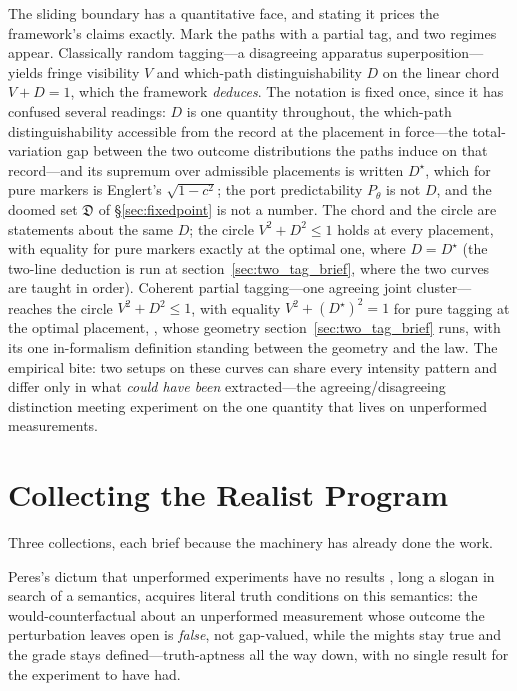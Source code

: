 \documentclass[11pt]{article}
\theoremstyle{definition}
\begin{document}
The sliding boundary has a quantitative face, and stating it prices the framework's claims exactly. Mark the paths with a partial tag, and two regimes appear. Classically random tagging---a disagreeing apparatus superposition---yields fringe visibility $V$ and which-path distinguishability $D$ on the linear chord $V + D = 1$, which the framework \emph{deduces}. The notation is fixed once, since it has confused several readings: $D$ is one quantity throughout, the which-path distinguishability accessible from the record at the placement in force---the total-variation gap between the two outcome distributions the paths induce on that record---and its supremum over admissible placements is written $D^{\star}$, which for pure markers is Englert's $\sqrt{1 - c^2}$; the port predictability $P_\theta$ is not $D$, and the doomed set $\mathfrak{D}$ of \S\ref{sec:fixedpoint} is not a number. The chord and the circle are statements about the same $D$; the circle $V^2 + D^2 \le 1$ holds at every placement, with equality for pure markers exactly at the optimal one, where $D = D^{\star}$ (the two-line deduction is run at section~\ref{sec:two_tag_brief}, where the two curves are taught in order). Coherent partial tagging---one agreeing joint cluster---reaches the circle $V^2 + D^2 \le 1$, with equality $V^2 + (D^{\star})^2 = 1$ for pure tagging at the optimal placement, \cite{greenberger1988simultaneous, englert1996fringe}, whose geometry section~\ref{sec:two_tag_brief} runs, with its one in-formalism definition standing between the geometry and the law. The empirical bite: two setups on these curves can share every intensity pattern and differ only in what \emph{could have been} extracted---the agreeing/disagreeing distinction meeting experiment on the one quantity that lives on unperformed measurements.

\section{Collecting the Realist Program}\label{sec:collection}

Three collections, each brief because the machinery has already done the work.

Peres's dictum that unperformed experiments have no results \cite{peres1978unperformed}, long a slogan in search of a semantics, acquires literal truth conditions on this semantics: the would-counterfactual about an unperformed measurement whose outcome the perturbation leaves open is \emph{false}, not gap-valued, while the mights stay true and the grade stays defined---truth-aptness all the way down, with no single result for the experiment to have had.
\end{document}
